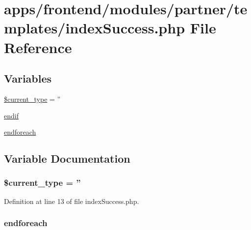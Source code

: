 \hypertarget{frontend_2modules_2partner_2templates_2index_success_8php}{\section{apps/frontend/modules/partner/templates/index\-Success.php File Reference}
\label{frontend_2modules_2partner_2templates_2index_success_8php}
}
\subsection*{Variables}
\begin{DoxyCompactItemize}
\item 
\hyperlink{frontend_2modules_2partner_2templates_2index_success_8php_a964fe32a232b35357174cdc317a4c647}{\$current\-\_\-type} = ''
\item 
\hyperlink{frontend_2modules_2partner_2templates_2index_success_8php_a82cd33ca97ff99f2fcc5e9c81d65251b}{endif}
\item 
\hyperlink{frontend_2modules_2partner_2templates_2index_success_8php_a672d9707ef91db026c210f98cc601123}{endforeach}
\end{DoxyCompactItemize}


\subsection{Variable Documentation}
\hypertarget{frontend_2modules_2partner_2templates_2index_success_8php_a964fe32a232b35357174cdc317a4c647}{
\subsubsection[{\$current\-\_\-type}]{\setlength{\rightskip}{0pt plus 5cm}\$current\-\_\-type = ''}}\label{frontend_2modules_2partner_2templates_2index_success_8php_a964fe32a232b35357174cdc317a4c647}


Definition at line 13 of file index\-Success.\-php.

\hypertarget{frontend_2modules_2partner_2templates_2index_success_8php_a672d9707ef91db026c210f98cc601123}{
\subsubsection[{endforeach}]{\setlength{\rightskip}{0pt plus 5cm}endforeach}}\label{frontend_2modules_2partner_2templates_2index_success_8php_a672d9707ef91db026c210f98cc601123}


